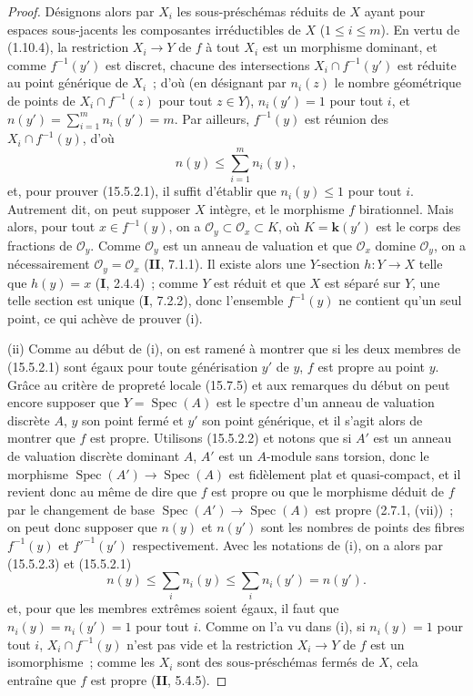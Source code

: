 \begin{proof}
Désignons alors par $X_i$ les sous-préschémas réduits de $X$ ayant pour espaces sous-jacents les composantes irréductibles de $X$ ($1\leqslant i\leqslant m$). En vertu de (1.10.4), la restriction $X_i\to Y$ de $f$ à tout $X_i$ est un morphisme dominant, et comme $f^{-1}(y')$ est discret, chacune des intersections $X_i\cap f^{-1}(y')$ est réduite au point générique de $X_i$~; d'où (en désignant par $n_i(z)$ le nombre géométrique de points de $X_i\cap f^{-1}(z)$ pour tout $z\in Y$), $n_i(y')=1$ pour tout $i$, et $n(y')=\sum_{i=1}^{m}n_i(y')=m$. Par ailleurs, $f^{-1}(y)$ est réunion des $X_i\cap f^{-1}(y)$, d'où
\begin{equation}
\tag{15.5.2.3}
\label{IV.15.5.2.3-fr}
  n(y)\leqslant\sum_{i=1}^{m}n_i(y),
\end{equation}
et, pour prouver (15.5.2.1), il suffit d'établir que $n_i(y)\leqslant 1$ pour tout $i$. Autrement dit, on peut supposer $X$ intègre, et le morphisme $f$ birationnel. Mais alors, pour tout $x\in f^{-1}(y)$, on a $\mathcal O_y\subset\mathcal O_x\subset K$, où $K=\mathbf{k}(y')$ est le corps des fractions de $\mathcal O_y$. Comme $\mathcal O_y$ est un anneau de valuation et que $\mathcal O_x$ domine $\mathcal O_y$, on a nécessairement $\mathcal O_y=\mathcal O_x$ (\textbf{II}, 7.1.1). Il existe alors une $Y$-section $h:Y\to X$ telle que $h(y)=x$ (\textbf{I}, 2.4.4)~; comme $Y$ est réduit et que $X$ est séparé sur $Y$, une telle section est unique (\textbf{I}, 7.2.2), donc l'ensemble $f^{-1}(y)$ ne contient qu'un seul point, ce qui achève de prouver (i).

(ii) Comme au début de (i), on est ramené à montrer que si les deux membres de (15.5.2.1) sont égaux pour toute générisation $y'$ de $y$, $f$ est propre au point $y$. Grâce au critère de propreté locale (15.7.5) et aux remarques du début on peut encore supposer que $Y=\operatorname{Spec}(A)$ est le spectre d'un anneau de valuation discrète $A$, $y$ son point fermé et $y'$ son point générique, et il s'agit alors de montrer que $f$ est propre. Utilisons (15.5.2.2) et notons que si $A'$ est un anneau de valuation discrète dominant $A$, $A'$ est un $A$-module sans torsion, donc le morphisme $\operatorname{Spec}(A')\to\operatorname{Spec}(A)$ est fidèlement plat et quasi-compact, et il revient donc au même de dire que $f$ est propre ou que le morphisme déduit de $f$ par le changement de base $\operatorname{Spec}(A')\to\operatorname{Spec}(A)$ est
propre (2.7.1, (vii))~; on peut donc supposer que $n(y)$ et $n(y')$ sont les nombres de points des fibres $f^{-1}(y)$ et $f'^{-1}(y')$ respectivement. Avec les notations de (i), on a alors par (15.5.2.3) et (15.5.2.1)
\begin{equation}
\tag{15.5.2.4}
\label{IV.15.5.2.4-fr}
  n(y)\leqslant\sum_i n_i(y)\leqslant\sum_i n_i(y')=n(y').
\end{equation}
et, pour que les membres extrêmes soient égaux, il faut que $n_i(y)=n_i(y')=1$ pour tout $i$. Comme on l'a vu dans (i), si $n_i(y)=1$ pour tout $i$, $X_i\cap f^{-1}(y)$ n'est pas vide et la restriction $X_i\to Y$ de $f$ est un isomorphisme~; comme les $X_i$ sont des sous-préschémas fermés de $X$, cela entraîne que $f$ est propre (\textbf{II}, 5.4.5).


\end{proof}
